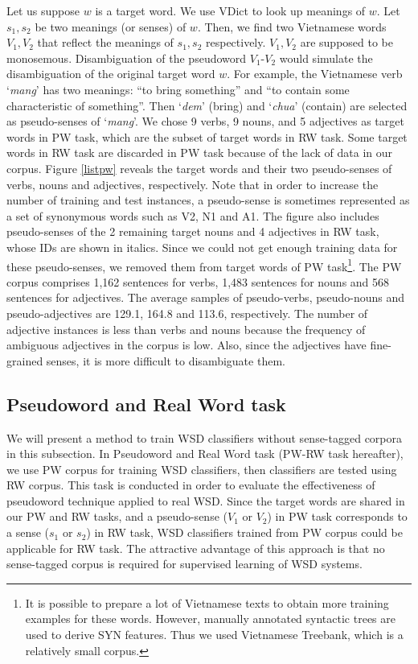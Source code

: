 \documentclass[english]{jnlp_1.4}
\begin{document}
Let us suppose $w$ is a target word.
 We use VDict to look up meanings of $w$. Let $s_{1}, s_{2}$ be two meanings (or senses) of $w$. 
 Then, we find two Vietnamese words $V_{1}, V_{2}$ that reflect the meanings of $s_{1}, s_{2}$ respectively. $V_{1}, V_{2}$ are supposed to be monosemous. 
Disambiguation of the pseudoword $V_{1}$-$V_{2}$ would simulate the disambiguation of the original target word $w$.
For example, the Vietnamese verb `\textit{mang}' has two meanings: ``to bring something'' and ``to contain some characteristic of something''. Then `\textit{dem}' (bring) and `\textit{chua}' (contain) are selected as pseudo-senses of `\textit{mang}'.
We chose 9 verbs, 9 nouns, and 5 adjectives as target words in PW task,
which are the subset of target words in RW task. 
Some target words in RW task are discarded in PW task because of the lack of data in our corpus.
Figure \ref{listpw} reveals the target words and their two pseudo-senses of verbs, nouns and adjectives, respectively.
Note that in order to increase the number of training and test instances, a pseudo-sense is sometimes represented as a set of synonymous words such as V2, N1 and A1.
The figure also includes pseudo-senses of the 2 remaining target nouns and 4 adjectives in RW task,
whose IDs are shown in italics.
Since we could not get enough training data for these pseudo-senses, 
we removed them from target words of PW task\footnote{It is possible to prepare a lot of Vietnamese texts to obtain more training examples for these words. However, manually annotated syntactic trees are used to derive SYN features. Thus we used Vietnamese Treebank, which is a relatively small corpus.}.
The PW corpus comprises 1,162 sentences for verbs, 1,483 sentences for nouns and 568 sentences for adjectives. The average samples of pseudo-verbs, pseudo-nouns and pseudo-adjectives are 129.1, 164.8 and 113.6, respectively.
The number of adjective instances is less than verbs and nouns because the frequency of ambiguous adjectives in the corpus is low.
Also, since the adjectives have fine-grained senses, 
it is more difficult to disambiguate them.


\subsection{Pseudoword and Real Word task}
We will present a method to train WSD classifiers without sense-tagged corpora in this subsection.
In Pseudoword and Real Word task (PW-RW task hereafter), 
we use PW corpus for training WSD classifiers, 
then classifiers are tested using RW corpus.
This task is conducted in order to evaluate the effectiveness of pseudoword technique applied to real WSD. 
Since the target words are shared in our PW and RW tasks, and a pseudo-sense ($V_{1}$ or $V_{2}$) in PW task corresponds to a sense ($s_{1}$ or $s_{2}$) in RW task, WSD classifiers trained from PW corpus could be applicable for RW task.
The attractive advantage of this approach is that no sense-tagged corpus is required for supervised learning of WSD systems.
\end{document}
